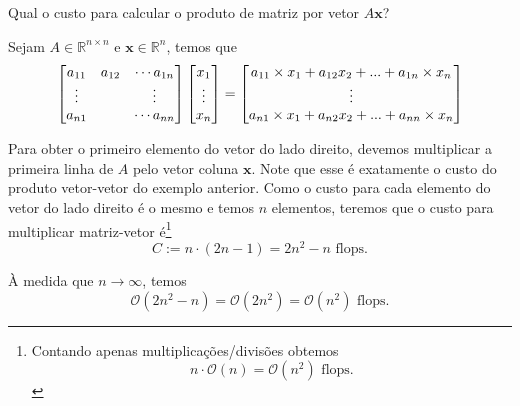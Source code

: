 \begin{ex}
Qual o custo para calcular o produto de matriz por vetor $A \pmb{x}$?
\end{ex}
\begin{sol}
 Sejam $A \in \mathbb{R}^{n\times n}$ e $\pmb{x} \in \mathbb{R}^n$, temos que
\begin{equation}
  \begin{bmatrix} a_{11}&a_{12}&\cdots a_{1n} \\ \vdots&&\vdots \\ a_{n1}&&\cdots a_{nn} \end{bmatrix} \begin{bmatrix} x_1 \\ \vdots \\ x_n \end{bmatrix}
  =\begin{bmatrix}  a_{11}\times x_1 + a_{12}x_2 +...+a_{1n}\times x_n  \\ \vdots \\ a_{n1}\times x_1 + a_{n2}x_2 +...+a_{nn}\times x_n \end{bmatrix}
\end{equation}

Para obter o primeiro elemento do vetor do lado direito, devemos multiplicar a  primeira linha de $A$ pelo vetor coluna $\pmb{x}$. Note que esse é exatamente o custo do produto vetor-vetor do exemplo anterior. Como o custo para cada elemento do vetor do lado direito é o mesmo e temos $n$ elementos, teremos que o custo para multiplicar matriz-vetor é\footnote{Contando apenas multiplicações/divisões obtemos
\begin{equation}
  n\cdot \mathcal{O}(n) = \mathcal{O}(n^2) \text{~flops.}
\end{equation}
}
\begin{equation}
  C:=n \cdot ( 2n-1) = 2n^2-n \text{~flops}.
\end{equation}

À medida que $n \rightarrow \infty$, temos
\begin{equation}
  \mathcal{O}(2n^2-n) =\mathcal{O}(2n^2)=\mathcal{O}(n^2) \text{~flops.}
\end{equation}

\end{sol}

